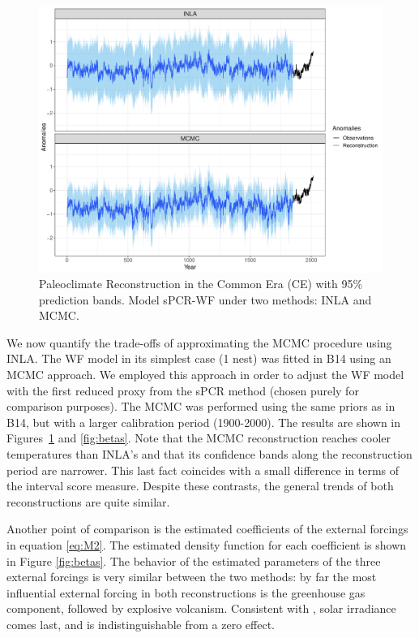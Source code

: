 \documentclass[12pt]{amsart}
\theoremstyle{plain}
\theoremstyle{definition}
\theoremstyle{remark}
\begin{document}
\begin{figure}[h!]
  \centering
  \includegraphics[scale=0.3]{RecCE_MCMC}
  \caption{Paleoclimate Reconstruction in the Common Era (CE) with 95\%
    prediction bands. Model sPCR-WF under two methods: INLA and MCMC.}
  \label{fig:paleoCE4}
\end{figure}

We now quantify the trade-offs of approximating the MCMC procedure using INLA. The WF model in its simplest case (1 nest) was fitted in B14
using an MCMC approach. We employed this approach in order to adjust the
WF model with the first reduced proxy from the sPCR method (chosen purely
for comparison purposes). The MCMC was performed using the
same priors as in B14, but with a larger calibration period
(1900-2000). The results are shown in Figures~\ref{fig:paleoCE4} and
\ref{fig:betas}. Note that the MCMC reconstruction reaches cooler temperatures
than INLA's and that its confidence bands along the reconstruction period are
narrower. This last fact coincides with a small difference in terms of the
interval score measure. Despite these contrasts, the general trends of both reconstructions are quite similar. 

Another point of comparison is the estimated coefficients of the
external forcings in equation \eqref{eq:M2}. The estimated density function
for each coefficient is shown in Figure \ref{fig:betas}. The behavior of the
estimated parameters of the three external forcings is very similar between the
two methods: by far the most influential external forcing in
both reconstructions is the greenhouse gas component, followed by explosive volcanism. Consistent with \citet{Schurer2013b}, solar irradiance comes last, and is indistinguishable from a zero effect. 
\end{document}
